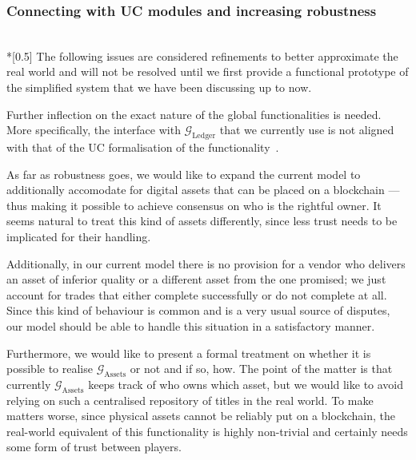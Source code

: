 \subsubsection{Connecting with UC modules and increasing robustness} \ \\*[0.5\baselineskip]
  The following issues are considered refinements to better approximate the real world and
  will not be resolved until we first provide a functional prototype of the simplified
  system that we have been discussing up to now.

  Further inflection on the exact nature of the global functionalities is needed. More
  specifically, the interface with $\mathcal{G}_{\mathrm{Ledger}}$ that we currently use
  is not aligned with that of the UC formalisation of the functionality~\cite{ucledger}.

  As far as robustness goes, we would like to expand the current model to additionally
  accomodate for digital assets that can be placed on a blockchain --- thus making it
  possible to achieve consensus on who is the rightful owner. It seems natural to treat
  this kind of assets differently, since less trust needs to be implicated for their
  handling.

  Additionally, in our current model there is no provision for a vendor who delivers an
  asset of inferior quality or a different asset from the one promised; we just account
  for trades that either complete successfully or do not complete at all. Since this kind
  of behaviour is common and is a very usual source of disputes, our model should be able
  to handle this situation in a satisfactory manner.

  Furthermore, we would like to present a formal treatment on whether it is possible to
  realise $\mathcal{G}_{\mathrm{Assets}}$ or not and if so, how. The point of the matter
  is that currently $\mathcal{G}_{\mathrm{Assets}}$ keeps track of who owns which asset,
  but we would like to avoid relying on such a centralised repository of titles in the
  real world. To make matters worse, since physical assets cannot be reliably put on a
  blockchain, the real-world equivalent of this functionality is highly non-trivial and
  certainly needs some form of trust between players.

